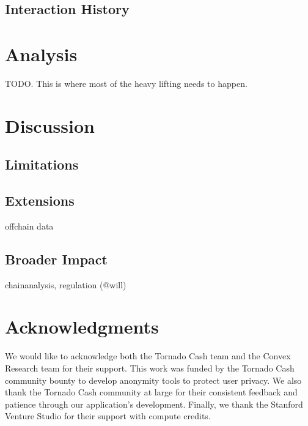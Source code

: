 \documentclass[11pt,a4paper]{article}
\begin{document}
\subsection{Interaction History}

\section{Analysis}

TODO. This is where most of the heavy lifting needs to happen.

\section{Discussion}

\subsection{Limitations}



\subsection{Extensions}

offchain data

\subsection{Broader Impact}

chainanalysis, regulation (@will)

\section*{Acknowledgments}
We would like to acknowledge both the Tornado Cash team and the Convex Research team for their support. This work was funded by the Tornado Cash community bounty to develop anonymity tools to protect user privacy. We also thank the Tornado Cash community at large for their consistent feedback and patience through our application's development. Finally, we thank the Stanford Venture Studio for their support with compute credits.



\end{document}
